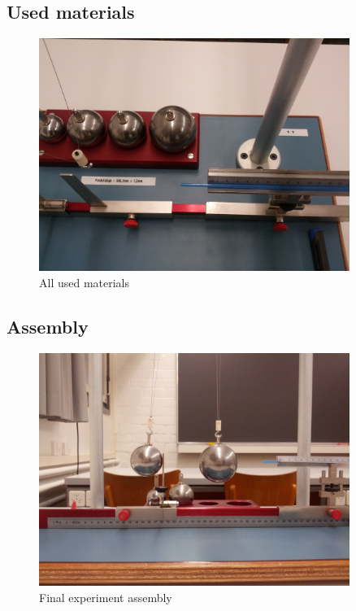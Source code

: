 \documentclass{scrreprt}
\begin{document}
\subsection{Used materials}
\begin{figure}[H]
	\centering
  \includegraphics[width=0.9\textwidth]{img/topview.jpg}
	\caption{All used materials}
	\label{fig:materials}
\end{figure}

\subsection{Assembly}
\begin{figure}[H]
	\centering
  \includegraphics[width=0.9\textwidth]{img/assembly.jpg}
	\caption{Final experiment assembly}
	\label{fig:assembly}
\end{figure}
\end{document}
